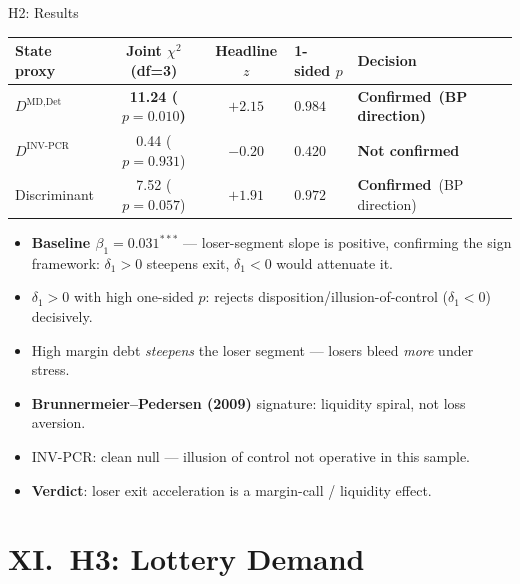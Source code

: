 \documentclass[10pt, aspectratio=169]{beamer}
\newcommand{\yes}{\textcolor{successgreen}{\textbf{Confirmed}}}
\newcommand{\no}{\textcolor{alertred}{\textbf{Not confirmed}}}
\begin{document}
\begin{frame}{H2: Results}
  \scriptsize
  \begin{tabular}{lccp{1.6cm}p{3.2cm}}
    \toprule
    State proxy & Joint $\chi^2$ (df=3) & Headline $z$ & 1-sided $p$ & Decision \\
    \midrule
    $D^{\text{MD,Det}}$  & \textbf{11.24 ($p=0.010$)} & $+2.15$ & $0.984$ & \yes\ \textbf{(BP direction)} \\
    $D^{\text{INV-PCR}}$ & 0.44 ($p=0.931$)           & $-0.20$ & $0.420$ & \no\ \\
    Discriminant         & 7.52 ($p=0.057$)            & $+1.91$ & $0.972$ & \yes\ (BP direction) \\
    \bottomrule
  \end{tabular}
  \normalsize
  \vspace{5pt}
  \begin{itemize}\itemsep3pt
    \item \textbf{Baseline $\beta_1 = 0.031^{***}$} — loser-segment slope is positive, confirming the sign framework: $\delta_1 > 0$ steepens exit, $\delta_1 < 0$ would attenuate it.
    \item \textbf{$\delta_1 > 0$} with high one-sided $p$: rejects disposition/illusion-of-control ($\delta_1 < 0$) decisively.
    \item High margin debt \emph{steepens} the loser segment — losers bleed \emph{more} under stress.
    \item \textbf{Brunnermeier–Pedersen (2009)} signature: liquidity spiral, not loss aversion.
    \item INV-PCR: clean null — illusion of control not operative in this sample.
    \item \textbf{Verdict}: loser exit acceleration is a margin-call / liquidity effect.
  \end{itemize}
\end{frame}

\section{XI.\ H3: Lottery Demand}
\end{document}
